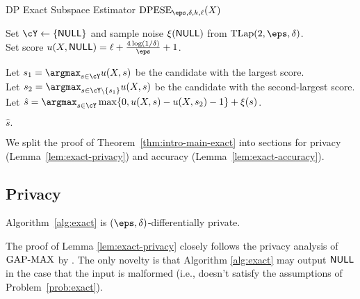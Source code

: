 \begin{algorithm}[h!] \label{alg:exact}
\caption{DP Exact Subspace Estimator
    $\DPESE_{\eps, \delta, k, \ell}(X)$}
\vspace{5pt}

Set $\cY \gets \{\NULL\}$ and sample noise $\xi(\mathsf{NULL})$ from $\TLap(2,\eps,\delta)$.\\
Set score $u(X,\NULL) = \ell + \frac{4\log(1/\delta)}{\eps} + 1$.
\vspace{5pt}

\vspace{5pt}

Let $s_1 = \argmax_{s \in \cY} u(X,s)$ be the candidate with the largest score.\\
Let $s_2 = \argmax_{s \in \cY \setminus \{s_1\}} u(X,s)$ be the candidate with the second-largest score.\\
Let $\hat s = \argmax_{s \in \cY} \max\{ 0 , u(X,s) - u(X,s_2) -1\} + \xi(s)$.\\

\vspace{5pt}
\Return $\hat{s}.$
\vspace{5pt}
\end{algorithm}

We split the proof of Theorem~\ref{thm:intro-main-exact} into sections
for privacy (Lemma~\ref{lem:exact-privacy}) and accuracy (Lemma~\ref{lem:exact-accuracy}).

\subsection{Privacy}

\begin{lemma}\label{lem:exact-privacy}
    Algorithm~\ref{alg:exact} is $(\eps,\delta)$-differentially
    private.
\end{lemma}
The proof of Lemma \ref{lem:exact-privacy} closely follows the
privacy analysis of $\mathrm{GAP\text{-}MAX}$ by \cite{BunDRS18}. The only novelty
is that Algorithm \ref{alg:exact} may output $\mathsf{NULL}$ in the case
that the input is malformed (i.e., doesn't satisfy the assumptions
of Problem~\ref{prob:exact}).

